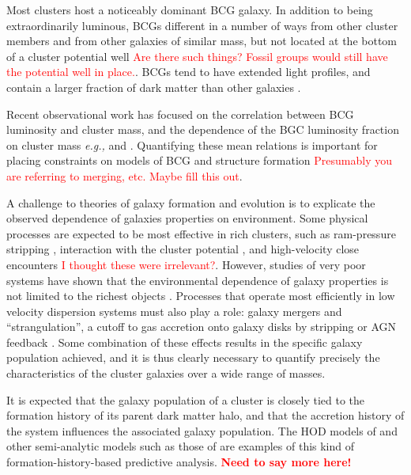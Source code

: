 \documentclass{emulateapj}
\begin{document}
Most clusters host a noticeably dominant BCG galaxy. In addition to being
extraordinarily luminous, BCGs different in a number of ways from other cluster
members and from other galaxies of similar mass, but not located at the bottom
of a cluster potential well \textcolor{red}{Are there such things? Fossil
groups would still have the potential well in place.}.  BCGs tend to have
extended light profiles, and contain a larger fraction of dark matter than
other galaxies \citep[e.g.,][]{Anja07, VO07}.  

Recent observational work has focused on the correlation between BCG luminosity
and cluster mass, and the dependence of the BGC luminosity fraction on cluster
mass {\it e.g.,} \citet{LinMohr04} and \citet{ZCZ07}. Quantifying these mean
relations is important for placing constraints on models of BCG and structure
formation \textcolor{red}{Presumably you are referring to merging, etc.  Maybe
fill this out}.

A challenge to theories of galaxy formation and evolution is to explicate the
observed dependence of galaxies properties on environment.  Some physical
processes are expected to be most effective in rich clusters, such as
ram-pressure stripping \citep{GunnGott72}, interaction with the cluster
potential \citep{ByrdValtonen90}, and high-velocity close encounters
\citep[``harassment;''][]{Moore96} \textcolor{red}{I thought these were
irrelevant?}. However, studies of very poor systems have shown that the
environmental dependence of galaxy properties is not limited to the richest
objects \citep[e.g.,][]{Zabludoff98,Weinmann06a,Gerke07}. Processes that
operate most efficiently in low velocity dispersion systems must also play a
role: galaxy mergers \citep{TT72} and ``strangulation'', a cutoff to gas
accretion onto galaxy disks by stripping or AGN feedback
\citep{Larson80,BNM00,Croton06}. Some combination of these effects results in
the specific galaxy population achieved, and it is thus clearly necessary to
quantify precisely the characteristics of the cluster galaxies over a wide
range of masses. 

It is expected that the galaxy population of a cluster is closely tied to the
formation history of its parent dark matter halo, and that the accretion
history of the system influences the associated galaxy population.  The HOD
models of \citet{} and other semi-analytic models such as those of \citet{} are
examples of this kind of formation-history-based predictive analysis.
\textcolor{red}{\bf Need to say more here!} 
\end{document}
